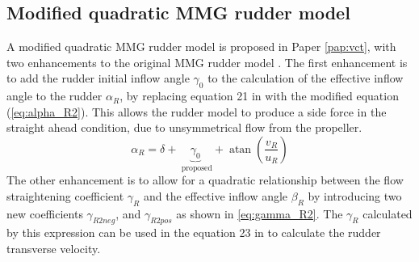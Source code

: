 \subsection{Modified quadratic MMG rudder model}
A modified quadratic MMG rudder model is proposed in Paper \ref{pap:vct}, with two enhancements to the original MMG rudder model \cite{yasukawaIntroductionMMGStandard2015}. The first enhancement is to add the rudder initial inflow angle $\gamma_0$ to the calculation of the effective inflow angle to the rudder $\alpha_R$, by replacing equation 21 in \textcite{yasukawaIntroductionMMGStandard2015} with the modified equation (\autoref{eq:alpha_R2}). This allows the rudder model to produce a side force in the straight ahead condition, due to unsymmetrical flow from the propeller. 
\begin{equation}
    \label{eq:alpha_R2}
    \alpha_{R} = \delta + \underbrace{\gamma_{0}}_{\text{ proposed}} + \operatorname{atan}{\left(\frac{v_{R}}{u_{R}} \right)}
\end{equation}
The other enhancement is to allow for a quadratic relationship between the flow straightening coefficient $\gamma_R$ and the effective inflow angle $\beta_R$ by introducing two new coefficients $\gamma_{R2neg}$, and $\gamma_{R2pos}$ as shown in \autoref{eq:gamma_R2}. The $\gamma_R$ calculated by this expression can be used in the equation 23 in \textcite{yasukawaIntroductionMMGStandard2015} to calculate the rudder transverse velocity.  
\begin{equation}
    \label{eq:gamma_R2}
    
\end{equation}
\clearpage